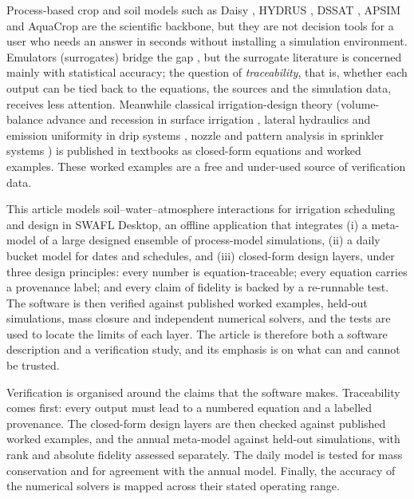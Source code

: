 Process-based crop and soil models such as Daisy \citep{Hansen1991,Hansen2012,Abrahamsen2000,Holbak2026}, HYDRUS \citep{Simunek2008,Simunek2016}, DSSAT \citep{Jones2003}, APSIM \citep{Keating2003} and AquaCrop \citep{Steduto2009} are the scientific backbone, but they are not decision tools for a user who needs an answer in seconds without installing a simulation environment. Emulators (surrogates) bridge the gap \citep{Razavi2012,Asher2015,Sacks1989,Kennedy2001}, but the surrogate literature is concerned mainly with statistical accuracy; the question of \emph{traceability}, that is, whether each output can be tied back to the equations, the sources and the simulation data, receives less attention. Meanwhile classical irrigation-design theory (volume-balance advance and recession in surface irrigation \citep{Walker1987,Elliott1982}, lateral hydraulics and emission uniformity in drip systems \citep{KellerKarmeli1974,Keller1990,Scaloppi1993}, nozzle and pattern analysis in sprinkler systems \citep{Christiansen1942,Keller1990,Playan2005}) is published in textbooks as closed-form equations and worked examples. These worked examples are a free and under-used source of verification data.

This article models soil--water--atmosphere interactions for irrigation scheduling and design in SWAFL Desktop, an offline application that integrates (i) a meta-model of a large designed ensemble of process-model simulations, (ii) a daily bucket model for dates and schedules, and (iii) closed-form design layers, under three design principles: every number is equation-traceable; every equation carries a provenance label; and every claim of fidelity is backed by a re-runnable test. The software is then verified against published worked examples, held-out simulations, mass closure and independent numerical solvers, and the tests are used to locate the limits of each layer. The article is therefore both a software description and a verification study, and its emphasis is on what can and cannot be trusted.

Verification is organised around the claims that the software makes. Traceability comes first: every output must lead to a numbered equation and a labelled provenance. The closed-form design layers are then checked against published worked examples, and the annual meta-model against held-out simulations, with rank and absolute fidelity assessed separately. The daily model is tested for mass conservation and for agreement with the annual model. Finally, the accuracy of the numerical solvers is mapped across their stated operating range.

